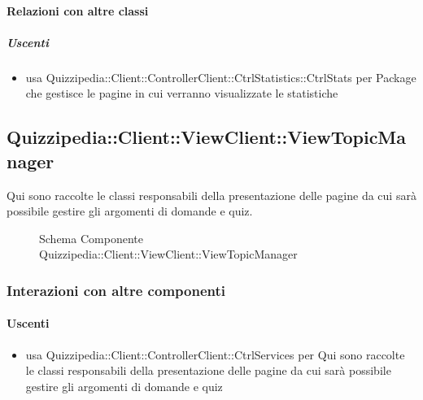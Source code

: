 \paragraph{Relazioni con altre classi}
\subparagraph{Uscenti}
\begin{itemize}
\item usa Quizzipedia::Client::ControllerClient::CtrlStatistics::CtrlStats per Package che gestisce le pagine in cui verranno visualizzate le statistiche
\end{itemize}
\subsection{Quizzipedia::Client::ViewClient::ViewTopicManager}
Qui sono raccolte le classi responsabili della presentazione delle pagine da cui sarà possibile gestire gli argomenti di domande e quiz.
\begin{figure}[H]
\centering
\noindent{}
\caption[Schema Componente Quizzipedia::Client::ViewClient::ViewTopicManager]{Schema Componente Quizzipedia::Client::ViewClient::ViewTopicManager}
\end{figure}
\subsubsection{Interazioni con altre componenti}
\paragraph{Uscenti}
\begin{itemize}
\item usa Quizzipedia::Client::ControllerClient::CtrlServices per Qui sono raccolte le classi responsabili della presentazione delle pagine da cui sarà possibile gestire gli argomenti di domande e quiz
\end{itemize}
